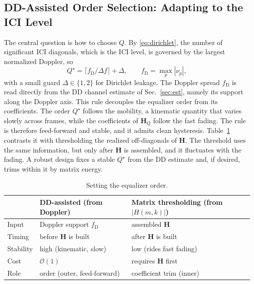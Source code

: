 \documentclass[onecolumn,journal]{IEEEtran}
\theoremstyle{bfhead}
\newcommand{\bH}{\bm{H}}
\begin{document}
\subsection{DD-Assisted Order Selection: Adapting to the ICI Level}
\label{sec:adapt}
The central question is how to choose $Q$. By \eqref{eq:dirichlet}, the number of
significant ICI diagonals, which is the ICI level, is governed by the largest
normalized Doppler, so
\begin{equation}
Q^\star=\big\lceil f_{\mathrm D}/\Delta f\big\rceil+\Delta,\qquad
f_{\mathrm D}=\max_p|\nu_p|,
\label{eq:adaptiveQ}
\end{equation}
with a small guard $\Delta\in\{1,2\}$ for Dirichlet leakage. The Doppler spread
$f_{\mathrm D}$ is read directly from the DD channel estimate of
Sec.~\ref{sec:est}, namely its support along the Doppler axis. This rule
decouples the equalizer order from its coefficients. The order $Q^\star$ follows
the mobility, a kinematic quantity that varies slowly across frames, while the
coefficients of $\bH_Q$ follow the fast fading. The rule is therefore
feed-forward and stable, and it admits clean hysteresis. Table~\ref{tab:qsel}
contrasts it with thresholding the realized off-diagonals of $\bH$. The threshold
uses the same information, but only after $\bH$ is assembled, and it fluctuates
with the fading. A robust design fixes a stable $Q^\star$ from the DD estimate
and, if desired, trims within it by matrix energy.

\begin{table}[!ht]
\centering
\caption{Setting the equalizer order.}
\label{tab:qsel}
\renewcommand{\arraystretch}{1.25}
\begin{tabular}{@{}l l l@{}}
\toprule
 & DD-assisted (from Doppler) & Matrix thresholding (from $|H(m,k)|$)\\
\midrule
Input     & Doppler support $f_{\mathrm D}$      & assembled $\bH$\\
Timing    & before $\bH$ is built                & after $\bH$ is built\\
Stability & high (kinematic, slow)               & low (rides fast fading)\\
Cost      & $\mathcal O(1)$                      & requires $\bH$ first\\
Role      & order (outer, feed-forward)          & coefficient trim (inner)\\
\bottomrule
\end{tabular}
\end{table}
\end{document}
